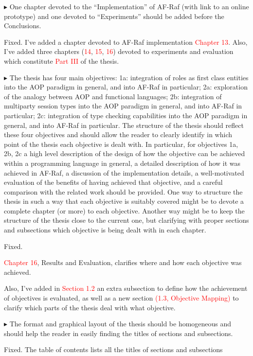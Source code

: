 \documentclass{article}
\newcommand*\R[1]{\textcolor{red}{#1}} %
\newenvironment{them}%
  {\bigskip\noindent\begingroup\color{blue}$\blacktriangleright$\enspace}%
  {\endgroup\par}
\begin{document}
\begin{them}
One chapter devoted to the ``Implementation'' of AF-Raf (with link to an online
prototype) and one devoted to ``Experiments'' should be added before the
Conclusions.
\end{them}
Fixed. I've added a chapter devoted to AF-Raf implementation \R{Chapter 13}.
Also, I've added three chapters (\R{14}, \R{15}, \R{16}) devoted to experiments
and evaluation which constitute \R{Part III} of the thesis.


\begin{them}
The thesis has four main objectives: 1a: integration of roles as first class
entities into the AOP paradigm in general, and into AF-Raf in particular; 2a:
exploration of the analogy between AOP and functional languages; 2b:
integration of multiparty session types into the AOP paradigm in general, and
into AF-Raf in particular; 2c: integration of type checking capabilities into
the AOP paradigm in general, and into AF-Raf in particular.  The structure of
the thesis should reflect these four objectives and should allow the reader to
clearly identify in which point of the thesis each objective is dealt with. In
particular, for objectives 1a, 2b, 2c a high level description of the design of
how the objective can be achieved within a programming language in general, a
detailed description of how it was achieved in AF-Raf, a discussion of the
implementation details, a well-motivated evaluation of the benefits of having
achieved that objective, and a careful comparison with the related work should
be provided.  One way to structure the thesis in such a way that each objective
is suitably covered might be to devote a complete chapter (or more) to each
objective. Another way might be to keep the structure of the thesis close to
the current one, but clarifying with proper sections and subsections which
objective is being dealt with in each chapter.
\end{them}
Fixed. 

\R{Chapter 16}, Results and Evaluation, clarifies where and how each objective
was achieved.

Also, I've added in \R{Section 1.2} an extra subsection to define how the
achievement of objectives is evaluated, as well as a new  section \R{(1.3,
Objective Mapping)} to clarify which parts of the thesis deal with what
objective.

\begin{them}
The format and graphical layout of the thesis should be homogeneous and should
help the reader in easily finding the titles of sections and subsections.
\end{them}
Fixed. The table of contents lists all the titles of sections and subsections
\end{document}
